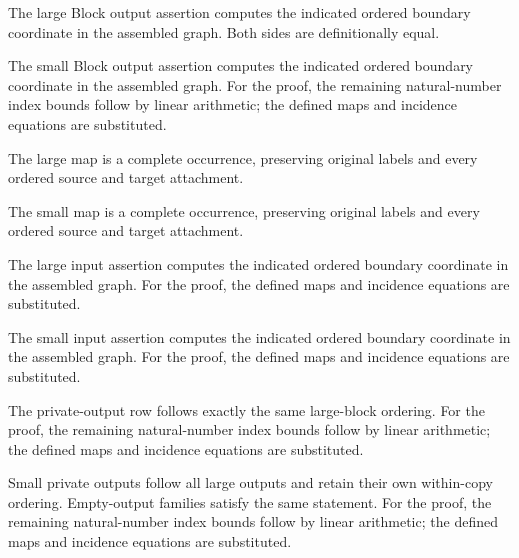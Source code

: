 The large Block output assertion computes the indicated ordered boundary coordinate in the assembled graph.
Both sides are definitionally equal.
\par{}

The small Block output assertion computes the indicated ordered boundary coordinate in the assembled graph.
For the proof, the remaining natural-number index bounds follow by linear arithmetic; the defined maps and incidence equations are substituted.
\par{}

The large map is a complete occurrence, preserving original labels and every ordered source and target attachment.
\par{}

The small map is a complete occurrence, preserving original labels and every ordered source and target attachment.
\par{}

The large input assertion computes the indicated ordered boundary coordinate in the assembled graph.
For the proof, the defined maps and incidence equations are substituted.
\par{}

The small input assertion computes the indicated ordered boundary coordinate in the assembled graph.
For the proof, the defined maps and incidence equations are substituted.
\par{}

The private-output row follows exactly the same large-block ordering.
For the proof, the remaining natural-number index bounds follow by linear arithmetic; the defined maps and incidence equations are substituted.
\par{}

Small private outputs follow all large outputs and retain their own within-copy ordering. Empty-output families satisfy the same statement.
For the proof, the remaining natural-number index bounds follow by linear arithmetic; the defined maps and incidence equations are substituted.
\par{}

